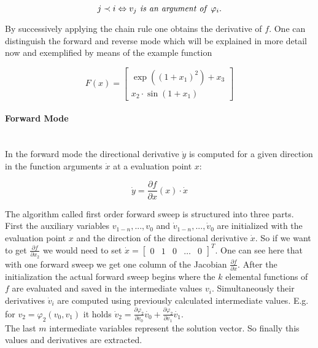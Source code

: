 \documentclass{scrartcl}[12pt, halfparskip]
\numberwithin{equation}{section}
\numberwithin{figure}{section}
\numberwithin{table}{section}
\begin{document}
\begin{equation}
j \prec i \Leftrightarrow v_j \text{\textit{ is an argument of }} \varphi_i.
\end{equation}

By successively applying the chain rule one obtains the derivative of $f$.
One can distinguish the forward and reverse mode which will be explained in more detail now and exemplified by means of the example function

\begin{equation}
F(x) = 
\begin{bmatrix}
\exp((1+x_1)^2) + x_3 \\
x_2 \cdot \sin(1+x_1)
\end{bmatrix}
\end{equation}


\paragraph{Forward Mode}\mbox{}\\
In the forward mode the directional derivative $\dot{y}$ is computed for a given direction in the function arguments $\dot{x}$ at a evaluation point $x$:

\begin{equation}
\dot{y} = \frac{\partial f}{\partial x}(x) \cdot \dot{x}
\label{eq:AD_example}
\end{equation}

The algorithm called first order forward sweep is structured into three parts. First the auxiliary variables $v_{1-n},...,v_0$ and $\dot{v}_{1-n},...,\dot{v}_0$ are initialized with the evaluation point $x$ and the direction of the directional derivative $\dot{x}$. So if we want to get $\frac{\partial f}{\partial x_2}$ we would need to set $\dot{x} = \begin{bmatrix}
0 & 1 & 0 & \dots & 0
\end{bmatrix}^T$. One can see here that with one forward sweep we get one column of the Jacobian $ \frac{\partial f}{\partial x}$. 
After the initialization the actual forward sweep begins where the $k$ elemental functions of $f$ are evaluated and saved in the intermediate values $v_i$. Simultaneously their derivatives  $\dot{v}_i$ are computed using previously calculated intermediate values. E.g. for $v_2 = \varphi_2(v_0, v_1)$ it holds $\dot{v}_2 = \frac{\partial \varphi_2}{\partial v_0} \dot{v_0} + \frac{\partial \varphi_2}{\partial v_1} \dot{v_1}$. \\
The last $m$ intermediate variables represent the solution vector. So finally this values and derivatives are extracted.
\end{document}
